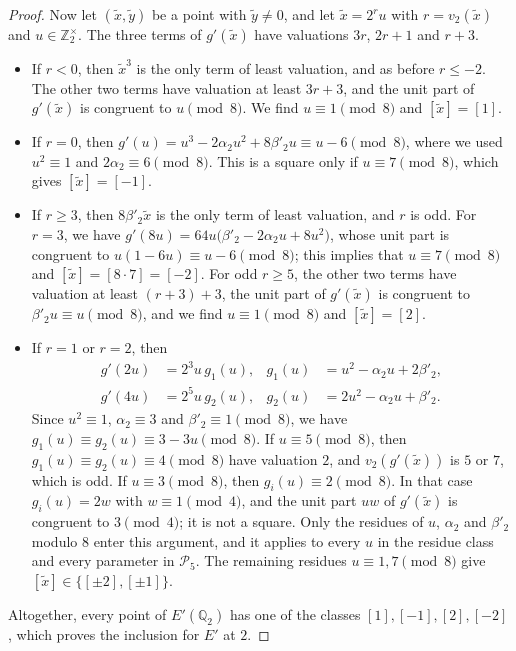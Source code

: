 \documentclass[12pt,oneside,openany]{book}
\theoremstyle{definition}
\theoremstyle{plain}
\numberwithin{equation}{chapter}
\theoremstyle{plain}
\theoremstyle{definition}
\theoremstyle{remark}
\newcommand{\Q}{\mathbb Q}
\newcommand{\Z}{\mathbb Z}
\newcommand{\sq}[1]{[#1]}
\newcommand{\cP}{\mathcal P}
\begin{document}
\begin{proof}
Now let $(\tilde x,\tilde y)$ be a point with $\tilde y\ne0$, and let $\tilde x=2^ru$ with $r=v_2(\tilde x)$ and $u\in\Z_2^\times$. The three terms of $g'(\tilde x)$ have valuations $3r$, $2r+1$ and $r+3$.
\begin{itemize}
\item If $r<0$, then $\tilde x^3$ is the only term of least valuation, and as before $r\le-2$. The other two terms have valuation at least $3r+3$, and the unit part of $g'(\tilde x)$ is congruent to $u\pmod8$. We find $u\equiv1\pmod8$ and $\sq{\tilde x}=\sq1$.
\item If $r=0$, then $g'(u)=u^3-2\alpha_2 u^2+8\beta'_2 u\equiv u-6\pmod 8$, where we used $u^2\equiv1$ and $2\alpha_2\equiv6\pmod8$. This is a square only if $u\equiv7\pmod8$, which gives $\sq{\tilde x}=\sq{-1}$.
\item If $r\ge3$, then $8\beta'_2 \tilde x$ is the only term of least valuation, and $r$ is odd. For $r=3$, we have $g'(8u)=64u\big(\beta'_2-2\alpha_2 u+8u^2\big)$, whose unit part is congruent to $u(1-6u)\equiv u-6\pmod8$; this implies that $u\equiv7\pmod8$ and $\sq{\tilde x}=\sq{8\cdot7}=\sq{-2}$. For odd $r\ge5$, the other two terms have valuation at least $(r+3)+3$, the unit part of $g'(\tilde x)$ is congruent to $\beta'_2 u\equiv u\pmod8$, and we find $u\equiv1\pmod8$ and $\sq{\tilde x}=\sq2$.
\item If $r=1$ or $r=2$, then
\[
\begin{aligned}
g'(2u)&=2^3u\,g_1(u),& g_1(u)&=u^2-\alpha_2 u+2\beta'_2,\\
g'(4u)&=2^5u\,g_2(u),& g_2(u)&=2u^2-\alpha_2 u+\beta'_2.
\end{aligned}
\]
Since $u^2\equiv1$, $\alpha_2\equiv3$ and $\beta'_2\equiv1\pmod8$, we have $g_1(u)\equiv g_2(u)\equiv3-3u\pmod8$. If $u\equiv5\pmod8$, then $g_1(u)\equiv g_2(u)\equiv4\pmod8$ have valuation $2$, and $v_2(g'(\tilde x))$ is $5$ or $7$, which is odd. If $u\equiv3\pmod8$, then $g_i(u)\equiv2\pmod8$. In that case $g_i(u)=2w$ with $w\equiv1\pmod4$, and the unit part $uw$ of $g'(\tilde x)$ is congruent to $3\pmod4$; it is not a square. Only the residues of $u$, $\alpha_2$ and $\beta'_2$ modulo $8$ enter this argument, and it applies to every $u$ in the residue class and every parameter in $\cP_5$. The remaining residues $u\equiv1,7\pmod8$ give $\sq{\tilde x}\in\{\sq{\pm2},\sq{\pm1}\}$.
\end{itemize}
Altogether, every point of $E'(\Q_2)$ has one of the classes $\sq1,\sq{-1},\sq2,\sq{-2}$, which proves the inclusion for $E'$ at $2$.


\end{proof}
\end{document}
